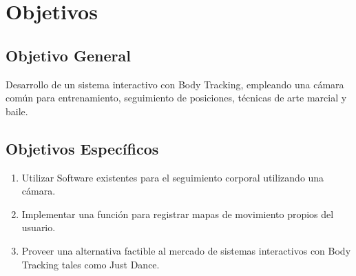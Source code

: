 \section{Objetivos}


\subsection{Objetivo General}

Desarrollo de un sistema interactivo con Body Tracking, empleando una cámara común para entrenamiento, seguimiento de posiciones, técnicas de arte marcial y baile.
\subsection{Objetivos Específicos}

\begin{enumerate}
	\item Utilizar Software existentes para el seguimiento corporal utilizando una cámara.
	\item Implementar una función para registrar mapas de movimiento propios del usuario.
	\item Proveer una alternativa factible al mercado de sistemas interactivos con Body Tracking tales como Just Dance.
\end{enumerate}

